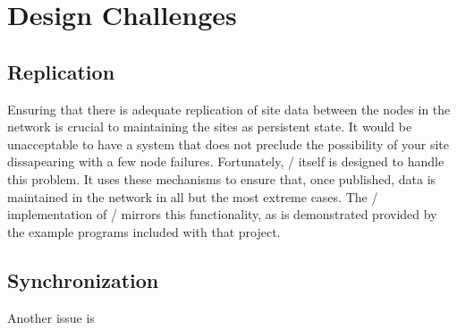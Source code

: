 \documentclass[11pt,twocolumn]{article}
\begin{document}
\section{Design Challenges}

\subsection{Replication}

Ensuring that there is adequate replication of site data between the nodes in the network is crucial to maintaining the sites as persistent state.
It would be unacceptable to have a system that does not preclude the possibility of your site dissapearing with a few node failures.
Fortunately, \Kademlia/ itself is designed to handle this problem.
It uses %
these mechanisms to ensure that, once published, data is maintained in the network in all but the most extreme cases.
The \Entangled/ implementation of \Kademlia/ mirrors this functionality, as is demonstrated provided by the example programs included with that project.

\subsection{Synchronization}

Another issue is 






\end{document}
